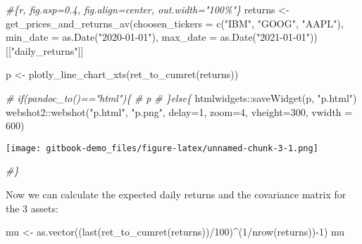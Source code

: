 \documentclass[
  oneside]{book}
\newenvironment{Shaded}{\begin{snugshade}}{\end{snugshade}}
\newcommand{\AttributeTok}[1]{\textcolor[rgb]{0.77,0.63,0.00}{#1}}
\newcommand{\CommentTok}[1]{\textcolor[rgb]{0.56,0.35,0.01}{\textit{#1}}}
\newcommand{\DecValTok}[1]{\textcolor[rgb]{0.00,0.00,0.81}{#1}}
\newcommand{\FunctionTok}[1]{\textcolor[rgb]{0.00,0.00,0.00}{#1}}
\newcommand{\NormalTok}[1]{#1}
\newcommand{\OtherTok}[1]{\textcolor[rgb]{0.56,0.35,0.01}{#1}}
\newcommand{\SpecialCharTok}[1]{\textcolor[rgb]{0.00,0.00,0.00}{#1}}
\newcommand{\StringTok}[1]{\textcolor[rgb]{0.31,0.60,0.02}{#1}}
\begin{document}
\begin{Shaded}
\begin{Highlighting}[]
\CommentTok{\#\textasciigrave{}\textasciigrave{}\textasciigrave{}\{r, fig.asp=0.4, fig.align=\textquotesingle{}center\textquotesingle{}, out.width="100\%"\}}
\NormalTok{returns }\OtherTok{\textless{}{-}} \FunctionTok{get\_prices\_and\_returns\_av}\NormalTok{(}\AttributeTok{choosen\_tickers =} \FunctionTok{c}\NormalTok{(}\StringTok{"IBM"}\NormalTok{, }\StringTok{"GOOG"}\NormalTok{, }\StringTok{"AAPL"}\NormalTok{), }\AttributeTok{min\_date =} \FunctionTok{as.Date}\NormalTok{(}\StringTok{"2020{-}01{-}01"}\NormalTok{), }\AttributeTok{max\_date =} \FunctionTok{as.Date}\NormalTok{(}\StringTok{"2021{-}01{-}01"}\NormalTok{))[[}\StringTok{"daily\_returns"}\NormalTok{]]}

\NormalTok{p }\OtherTok{\textless{}{-}} \FunctionTok{plotly\_line\_chart\_xts}\NormalTok{(}\FunctionTok{ret\_to\_cumret}\NormalTok{(returns))}

\CommentTok{\# if(pandoc\_to()=="html")\{}
\CommentTok{\#   p}
\CommentTok{\# \}else\{}
\NormalTok{htmlwidgets}\SpecialCharTok{::}\FunctionTok{saveWidget}\NormalTok{(p, }\StringTok{"p.html"}\NormalTok{)}
\NormalTok{webshot2}\SpecialCharTok{::}\FunctionTok{webshot}\NormalTok{(}\StringTok{"p.html"}\NormalTok{, }\StringTok{"p.png"}\NormalTok{, }\AttributeTok{delay=}\DecValTok{1}\NormalTok{, }\AttributeTok{zoom=}\DecValTok{4}\NormalTok{, }\AttributeTok{vheight=}\DecValTok{300}\NormalTok{, }\AttributeTok{vwidth =} \DecValTok{600}\NormalTok{)}
\end{Highlighting}
\end{Shaded}

\texttt{[image: gitbook-demo\_files/figure-latex/unnamed-chunk-3-1.png]}

\begin{Shaded}
\begin{Highlighting}[]
\CommentTok{\#\}}
\end{Highlighting}
\end{Shaded}

Now we can calculate the expected daily returns and the covariance matrix for the 3 assets:

\begin{Shaded}
\begin{Highlighting}[]
\NormalTok{mu }\OtherTok{\textless{}{-}} \FunctionTok{as.vector}\NormalTok{((}\FunctionTok{last}\NormalTok{(}\FunctionTok{ret\_to\_cumret}\NormalTok{(returns))}\SpecialCharTok{/}\DecValTok{100}\NormalTok{)}\SpecialCharTok{\^{}}\NormalTok{(}\DecValTok{1}\SpecialCharTok{/}\FunctionTok{nrow}\NormalTok{(returns))}\SpecialCharTok{{-}}\DecValTok{1}\NormalTok{)}
\NormalTok{mu}
\end{Highlighting}
\end{Shaded}
\end{document}
